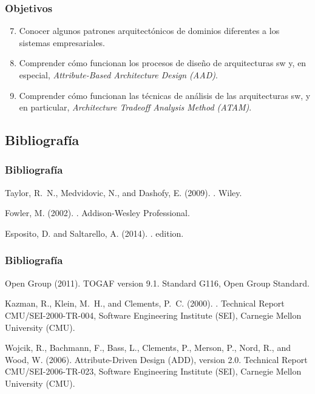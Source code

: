 ﻿\documentclass[handout,a4paper,slidestop,xcolor=pst,blue]{beamer}
\begin{document}
\begin{frame}[c]
    \frametitle{Objetivos}
    \begin{enumerate}[<+->]
        \setcounter{enumi}{6}
        \item Conocer algunos patrones arquitectónicos de dominios diferentes a los sistemas empresariales.
        \item Comprender cómo funcionan los procesos de diseño de arquitecturas sw y, en especial, \emph{Attribute-Based Architecture Design (AAD)}.
		\item Comprender cómo funcionan las técnicas de análisis de las arquitecturas sw, y en particular, \emph{Architecture Tradeoff Analysis Method (ATAM)}.
	\end{enumerate}
\end{frame}

\subsection{Bibliografía}

\begin{frame}[c]
	\frametitle{Bibliografía}
    \begin{thebibliography}{}
        Taylor, R.~N., Medvidovic, N., and Dashofy, E. (2009).
        .
        \newblock Wiley.

        Fowler, M. (2002).
        .
        \newblock Addison-Wesley Professional.

        Esposito, D. and Saltarello, A. (2014).
        .
         edition.
    \end{thebibliography}
\end{frame}

\begin{frame}[c]
	\frametitle{Bibliografía}
    \begin{thebibliography}{}
        Open Group (2011).
        \newblock TOGAF version 9.1.
        \newblock Standard G116, Open Group Standard.

        Kazman, R., Klein, M.~H., and Clements, P.~C. (2000).
        .
        \newblock Technical Report CMU/SEI-2000-TR-004, Software Engineering Institute
          (SEI), Carnegie Mellon University (CMU).

        Wojcik, R., Bachmann, F., Bass, L., Clements, P., Merson, P., Nord, R., and
          Wood, W. (2006).
        \newblock Attribute-Driven Design (ADD), version 2.0.
        \newblock Technical Report CMU/SEI-2006-TR-023, Software Engineering Institute
             (SEI), Carnegie Mellon University (CMU).
    \end{thebibliography}
\end{frame}
\end{document}
